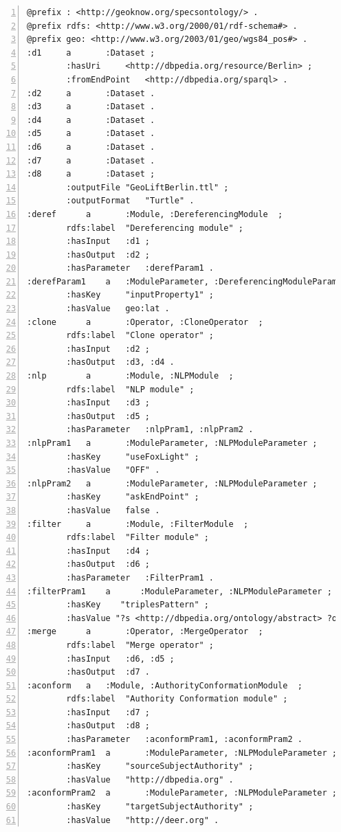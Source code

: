 \documentclass[a4paper,twoside,bibtotoc,abstracton,12pt,BCOR=15mm]{article}
\begin{document}
\begin{lstlisting}[label=lst:rdfconf, float=tp, basicstyle=\scriptsize, numbers=left, numberstyle=\tiny, caption = Example of RDF configuration file.]
@prefix : <http://geoknow.org/specsontology/> .
@prefix rdfs: <http://www.w3.org/2000/01/rdf-schema#> .
@prefix geo: <http://www.w3.org/2003/01/geo/wgs84_pos#> .
:d1		a		:Dataset ;
		:hasUri		<http://dbpedia.org/resource/Berlin> ;
		:fromEndPoint	<http://dbpedia.org/sparql> .
:d2		a		:Dataset .
:d3		a		:Dataset .
:d4		a		:Dataset .
:d5		a		:Dataset .
:d6		a		:Dataset .
:d7		a		:Dataset .
:d8		a		:Dataset ;
		:outputFile	"GeoLiftBerlin.ttl" ;
		:outputFormat	"Turtle" .
:deref		a		:Module, :DereferencingModule  ;
		rdfs:label	"Dereferencing module" ;
		:hasInput	:d1 ;
		:hasOutput	:d2 ;
		:hasParameter	:derefParam1 .
:derefParam1	a   :ModuleParameter, :DereferencingModuleParameter ;
		:hasKey		"inputProperty1" ;
		:hasValue	geo:lat .
:clone		a		:Operator, :CloneOperator  ;
		rdfs:label	"Clone operator" ;
		:hasInput	:d2 ;
		:hasOutput	:d3, :d4 .
:nlp		a		:Module, :NLPModule  ;
		rdfs:label	"NLP module" ;
		:hasInput	:d3 ;
		:hasOutput	:d5 ;
		:hasParameter	:nlpPram1, :nlpPram2 .
:nlpPram1	a		:ModuleParameter, :NLPModuleParameter ;
		:hasKey		"useFoxLight" ;
		:hasValue	"OFF" .
:nlpPram2 	a		:ModuleParameter, :NLPModuleParameter ;
		:hasKey		"askEndPoint" ;
		:hasValue	false .
:filter		a		:Module, :FilterModule  ;
		rdfs:label	"Filter module" ;
		:hasInput	:d4 ;
		:hasOutput	:d6 ;
		:hasParameter	:FilterPram1 .
:filterPram1	a      :ModuleParameter, :NLPModuleParameter ;
	    :hasKey    "triplesPattern" ;
	    :hasValue "?s <http://dbpedia.org/ontology/abstract> ?o".
:merge		a		:Operator, :MergeOperator  ;
		rdfs:label	"Merge operator" ;
		:hasInput	:d6, :d5 ;
		:hasOutput	:d7 .
:aconform	a	:Module, :AuthorityConformationModule  ;
		rdfs:label	"Authority Conformation module" ;
		:hasInput	:d7 ;
		:hasOutput	:d8 ;
		:hasParameter	:aconformPram1, :aconformPram2 .
:aconformPram1	a		:ModuleParameter, :NLPModuleParameter ;
		:hasKey		"sourceSubjectAuthority" ;
		:hasValue	"http://dbpedia.org" .
:aconformPram2	a		:ModuleParameter, :NLPModuleParameter ;
		:hasKey		"targetSubjectAuthority" ;
		:hasValue	"http://deer.org" .
\end{lstlisting}
\end{document}
